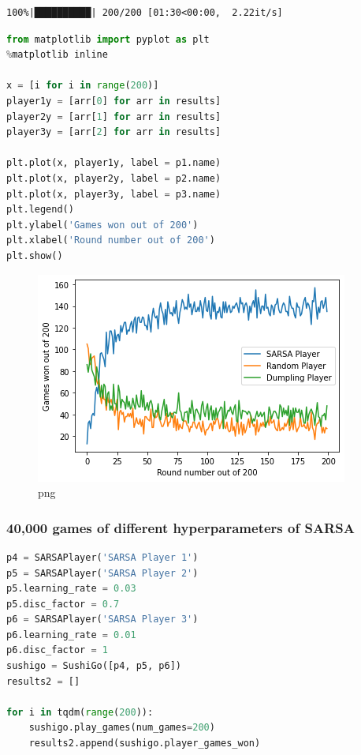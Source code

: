 \begin{lstlisting}
100%|██████████| 200/200 [01:30<00:00,  2.22it/s]
\end{lstlisting}

\begin{lstlisting}[language=Python]
from matplotlib import pyplot as plt
%matplotlib inline

x = [i for i in range(200)]
player1y = [arr[0] for arr in results]
player2y = [arr[1] for arr in results]
player3y = [arr[2] for arr in results]

plt.plot(x, player1y, label = p1.name)
plt.plot(x, player2y, label = p2.name)
plt.plot(x, player3y, label = p3.name)
plt.legend()
plt.ylabel('Games won out of 200')
plt.xlabel('Round number out of 200')
plt.show()
\end{lstlisting}

\begin{figure}
\centering
\includegraphics{sushigo_files/sushigo_10_0.png}
\caption{png}
\end{figure}

\hypertarget{games-of-different-hyperparameters-of-sarsa}{%
\subsubsection{40,000 games of different hyperparameters of
SARSA}\label{games-of-different-hyperparameters-of-sarsa}}

\begin{lstlisting}[language=Python]
p4 = SARSAPlayer('SARSA Player 1')
p5 = SARSAPlayer('SARSA Player 2')
p5.learning_rate = 0.03 
p5.disc_factor = 0.7
p6 = SARSAPlayer('SARSA Player 3')
p6.learning_rate = 0.01
p6.disc_factor = 1
sushigo = SushiGo([p4, p5, p6])
results2 = []
  
for i in tqdm(range(200)):
    sushigo.play_games(num_games=200)
    results2.append(sushigo.player_games_won)
\end{lstlisting}

